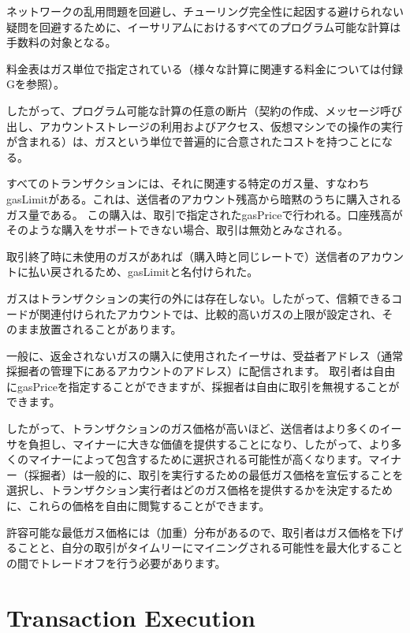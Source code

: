 \documentclass[9pt,oneside]{amsart}
\begin{document}
\begin{multicols}{2}
ネットワークの乱用問題を回避し、チューリング完全性に起因する避けられない疑問を回避するために、イーサリアムにおけるすべてのプログラム可能な計算は手数料の対象となる。

料金表はガス単位で指定されている（様々な計算に関連する料金については付録Gを参照）。

したがって、プログラム可能な計算の任意の断片（契約の作成、メッセージ呼び出し、アカウントストレージの利用およびアクセス、仮想マシンでの操作の実行が含まれる）は、ガスという単位で普遍的に合意されたコストを持つことになる。

すべてのトランザクションには、それに関連する特定のガス量、すなわちgasLimitがある。これは、送信者のアカウント残高から暗黙のうちに購入されるガス量である。
この購入は、取引で指定されたgasPriceで行われる。口座残高がそのような購入をサポートできない場合、取引は無効とみなされる。

取引終了時に未使用のガスがあれば（購入時と同じレートで）送信者のアカウントに払い戻されるため、gasLimitと名付けられた。

ガスはトランザクションの実行の外には存在しない。したがって、信頼できるコードが関連付けられたアカウントでは、比較的高いガスの上限が設定され、そのまま放置されることがあります。

一般に、返金されないガスの購入に使用されたイーサは、受益者アドレス（通常採掘者の管理下にあるアカウントのアドレス）に配信されます。
取引者は自由にgasPriceを指定することができますが、採掘者は自由に取引を無視することができます。

したがって、トランザクションのガス価格が高いほど、送信者はより多くのイーサを負担し、マイナーに大きな価値を提供することになり、したがって、より多くのマイナーによって包含するために選択される可能性が高くなります。マイナー（採掘者）は一般的に、取引を実行するための最低ガス価格を宣伝することを選択し、トランザクション実行者はどのガス価格を提供するかを決定するために、これらの価格を自由に閲覧することができます。

許容可能な最低ガス価格には（加重）分布があるので、取引者はガス価格を下げることと、自分の取引がタイムリーにマイニングされる可能性を最大化することの間でトレードオフを行う必要があります。


\section{Transaction Execution} \label{ch:transactions}


\end{multicols}
\end{document}
